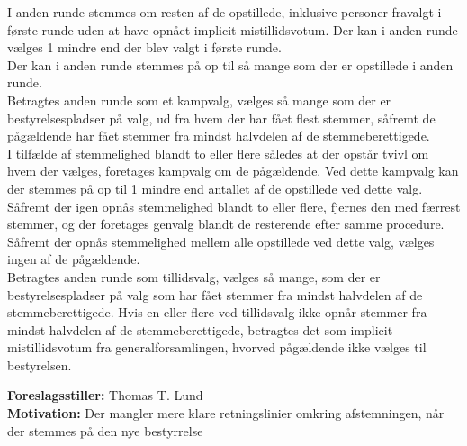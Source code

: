 \documentclass[a4paper,12pt,danish]{article}
\newcommand\who[1]{
    \textbf{Foreslagsstiller:} #1\\
}
\newcommand\why[1]{
    \textbf{Motivation:} #1\\
}
\begin{document}
{{{            I anden runde stemmes om resten af de opstillede, inklusive personer fravalgt i første runde uden at have opnået implicit mistillidsvotum. Der kan i anden runde vælges 1 mindre end der blev valgt i første runde.\\
            Der kan i anden runde stemmes på op til så mange som der er opstillede i anden runde.\\
            Betragtes anden runde som et kampvalg, vælges så mange som der er bestyrelsespladser på valg, ud fra hvem der har fået flest stemmer, såfremt de pågældende har fået stemmer fra mindst halvdelen af de stemmeberettigede.\\
            I tilfælde af stemmelighed blandt to eller flere således at der opstår tvivl om hvem der vælges, foretages kampvalg om de pågældende. Ved dette kampvalg kan der stemmes på op til 1 mindre end antallet af de opstillede ved dette valg. Såfremt der igen opnås stemmelighed blandt to eller flere, fjernes den med færrest stemmer, og der foretages genvalg blandt de resterende efter samme procedure. Såfremt der opnås stemmelighed mellem alle opstillede ved dette valg, vælges ingen af de pågældende.\\
            Betragtes anden runde som tillidsvalg, vælges så mange, som der er bestyrelsespladser på valg som har fået stemmer fra mindst halvdelen af de stemmeberettigede. Hvis en eller flere ved tillidsvalg ikke opnår stemmer fra mindst halvdelen af de stemmeberettigede, betragtes det som implicit mistillidsvotum fra generalforsamlingen, hvorved pågældende ikke vælges til bestyrelsen.
        }
        \who{Thomas T. Lund}
        \why{Der mangler mere klare retningslinier omkring afstemningen, når der stemmes på den nye bestyrrelse}
    }

}
\end{document}
